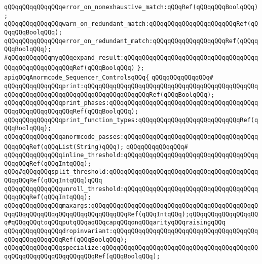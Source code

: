 \verb|qQQqqQQqqQQqqQQqerror_on_nonexhaustive_match:qQQqRef(qQQqqQQqBoolqQQq);|\newline
\verb|qQQqqQQqqQQqqQQqwarn_on_redundant_match:qQQqqQQqqQQqqQQqqQQqqQQqRef(qQQqqQQqBoolqQQq);|\newline
\verb|qQQqqQQqqQQqqQQqerror_on_redundant_match:qQQqqQQqqQQqqQQqqQQqRef(qQQqqQQqBoolqQQq);|\newline
\newline
\verb|#qQQqqQQqqQQqmyqQQqexpand_result:qQQqqQQqqQQqqQQqqQQqqQQqqQQqqQQqqQQqqQQqqQQqqQQqqQQqqQQqRef(qQQqBoolqQQq)|\newline
\newline
\verb|};|\newline
\newline
\verb|apiqQQqAnormcode_Sequencer_ControlsqQQq{|\newline
\verb|qQQqqQQqqQQqqQQq#|\newline
\verb|qQQqqQQqqQQqqQQqprint:qQQqqQQqqQQqqQQqqQQqqQQqqQQqqQQqqQQqqQQqqQQqqQQqqQQqqQQqqQQqqQQqqQQqqQQqqQQqqQQqqQQqqQQqRef(qQQqBoolqQQq);|\newline
\verb|qQQqqQQqqQQqqQQqprint_phases:qQQqqQQqqQQqqQQqqQQqqQQqqQQqqQQqqQQqqQQqqQQqqQQqqQQqqQQqqQQqRef(qQQqBoolqQQq);|\newline
\verb|qQQqqQQqqQQqqQQqprint_function_types:qQQqqQQqqQQqqQQqqQQqqQQqqQQqRef(qQQqBoolqQQq);|\newline
\verb|qQQqqQQqqQQqqQQqanormcode_passes:qQQqqQQqqQQqqQQqqQQqqQQqqQQqqQQqqQQqqQQqqQQqRef(qQQqList(String)qQQq);|\newline
\verb|qQQqqQQqqQQqqQQq#|\newline
\verb|qQQqqQQqqQQqqQQqinline_threshold:qQQqqQQqqQQqqQQqqQQqqQQqqQQqqQQqqQQqqQQqqQQqRef(qQQqIntqQQq);|\newline
\verb|qQQq#qQQqqQQqsplit_threshold:qQQqqQQqqQQqqQQqqQQqqQQqqQQqqQQqqQQqqQQqqQQqqQQqRef(qQQqIntqQQq)qQQq|\newline
\verb|qQQqqQQqqQQqqQQqunroll_threshold:qQQqqQQqqQQqqQQqqQQqqQQqqQQqqQQqqQQqqQQqqQQqRef(qQQqIntqQQq);|\newline
\verb|qQQqqQQqqQQqqQQqmaxargs:qQQqqQQqqQQqqQQqqQQqqQQqqQQqqQQqqQQqqQQqqQQqqQQqqQQqqQQqqQQqqQQqqQQqqQQqqQQqqQQqRef(qQQqIntqQQq);qQQqqQQqqQQqqQQqqQQq#qQQqqQQqtoqQQqputqQQqaqQQqcapqQQqonqQQqarityqQQqraisingqQQq|\newline
\verb|qQQqqQQqqQQqqQQqdropinvariant:qQQqqQQqqQQqqQQqqQQqqQQqqQQqqQQqqQQqqQQqqQQqqQQqqQQqqQQqRef(qQQqBoolqQQq);|\newline
\newline
\verb|qQQqqQQqqQQqqQQqspecialize:qQQqqQQqqQQqqQQqqQQqqQQqqQQqqQQqqQQqqQQqqQQqqQQqqQQqqQQqqQQqqQQqqQQqRef(qQQqBoolqQQq);|\newline
